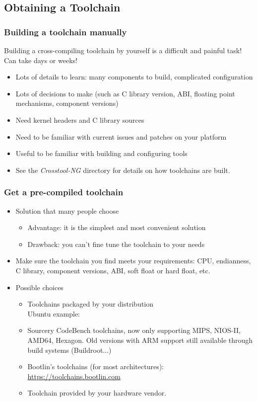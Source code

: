 \subsection{Obtaining a Toolchain}

\begin{frame}
  \frametitle{Building a toolchain manually}

  Building a cross-compiling toolchain by yourself is a difficult and painful
  task! Can take days or weeks!
  \begin{itemize}
  \item Lots of details to learn: many components to build, complicated
    configuration
  \item Lots of decisions to make (such as C library version, ABI, floating point
    mechanisms, component versions)
  \item Need kernel headers and C library sources
  \item Need to be familiar with current  issues and patches
    on your platform
  \item Useful to be familiar with building and configuring tools
  \item See the {\em Crosstool-NG}  directory for details
    on how toolchains are built.
\end{itemize}
\end{frame}

\begin{frame}
  \frametitle{Get a pre-compiled toolchain}
  \begin{itemize}
  \item Solution that many people choose
    \begin{itemize}
    \item Advantage: it is the simplest and most convenient solution
    \item Drawback: you can't fine tune the toolchain to your needs
    \end{itemize}
  \item Make sure the toolchain you find meets your requirements:
    CPU, endianness, C library, component versions, ABI, soft float
    or hard float, etc.
  \item Possible choices
    \begin{itemize}
    \item Toolchains packaged by your distribution\\
	  Ubuntu example:\\
    \item Sourcery CodeBench toolchains, now only supporting MIPS,
	  NIOS-II, AMD64, Hexagon. Old versions with ARM support still
	  available through build systems (Buildroot...)
    \item Bootlin's toolchains (for most architectures):
          \url{https://toolchains.bootlin.com} 
    \item Toolchain provided by your hardware vendor.
    \end{itemize}
  \end{itemize}
\end{frame}

